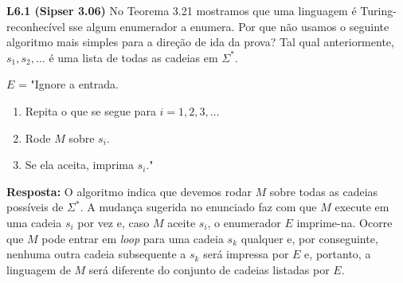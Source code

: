 
\noindent \textbf{L6.1 (Sipser 3.06)} No Teorema 3.21 mostramos que uma linguagem é Turing-reconhecível sse algum
enumerador a enumera. Por que não usamos o seguinte algoritmo mais simples para a direção de ida da prova? Tal qual anteriormente, $s_1, s_2, \ldots $ é uma lista de todas as cadeias em $\Sigma^*$.

$E$ = "Ignore a entrada.
\begin{enumerate}[label={\textbf{\arabic*.}}, leftmargin=1.05in]
\item Repita o que se segue para $i = 1, 2, 3, \ldots$
\item Rode $M$ sobre $s_i$.
\item Se ela aceita, imprima $s_i$."
\end{enumerate}

\textbf{Resposta: } O algoritmo indica que devemos rodar $M$ sobre todas as cadeias possíveis de $\Sigma^*$. A mudança sugerida no enunciado faz com que $M$ execute em uma cadeia $s_i$ por vez e, caso $M$ aceite $s_i$, o enumerador $E$ imprime-na. Ocorre que $M$ pode entrar em \textit{loop} para uma cadeia $s_k$ qualquer e, por conseguinte, nenhuma outra cadeia subsequente a $s_k$ será impressa por $E$ e, portanto, a linguagem de $M$ será diferente do conjunto de cadeias listadas por $E$.\\[6pt]